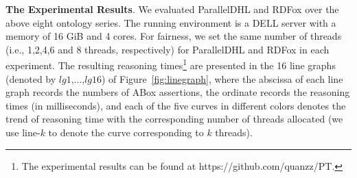 \begin{table}[htb]
{%
}
\label{tab:expresult}
\end{table}

\textbf{The Experimental Results}.
We evaluated ParallelDHL and RDFox over the above eight ontology series.
The running environment is a DELL server with a
memory of 16 GiB and 4 cores.
For fairness, we set the same number of threads (i.e., 1,2,4,6 and 8 threads, respectively)
for ParallelDHL and RDFox in each experiment. The resulting reasoning
times\footnote{The experimental results can be found at https://github.com/quanzz/PT.} are
presented in the 16 line graphs (denoted by $lg1$,...,$lg16$) of Figure~\ref{fig:linegraph},
where the abscissa of each line graph records the numbers of ABox assertions,
the ordinate records the reasoning times (in milliseconds),
and each of the five curves in different colors denotes the trend of reasoning time with the
corresponding number of threads allocated (we use line-$k$ to denote the curve
corresponding to $k$ threads).

